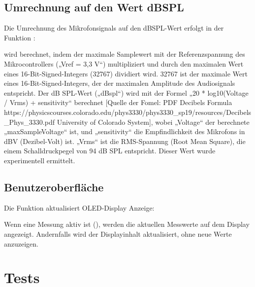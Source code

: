 \subsection{Umrechnung auf den Wert dBSPL}

Die Umrechnung des Mikrofonsignals auf den dBSPL-Wert erfolgt in der Funktion :

{
    \label{TestMicrophone:dBSPL}
}

 wird berechnet, indem der maximale Samplewert  mit der Referenzspannung des Mikrocontrollers („Vref = 3,3 V“) multipliziert und durch den maximalen Wert eines 16-Bit-Signed-Integers (32767) dividiert wird. 32767 ist der maximale Wert eines 16-Bit-Signed-Integers, der der maximalen Amplitude des Audiosignals entspricht.
Der dB SPL-Wert („dBspl“) wird mit der Formel „20 * log10(Voltage / Vrms) + sensitivity“ berechnet [Quelle der Fomel: PDF Decibels Formula https://physicscourses.colorado.edu/phys3330/phys3330\_sp19/resources/Decibels\_Phys\_3330.pdf University of Colorado System], wobei „Voltage“ der berechnete „maxSampleVoltage“ ist, und „sensitivity“ die Empfindlichkeit des Mikrofons in dBV (Dezibel-Volt) ist. „Vrms“ ist die RMS-Spannung (Root Mean Square), die einem Schalldruckpegel von 94 dB SPL entspricht. Dieser Wert wurde experimentell ermittelt.


\subsection{Benutzeroberfläche}
Die Funktion  aktualisiert OLED-Display Anzeige:


{
    \label{TestMicrophone:OLED}
}


Wenn eine Messung aktiv ist (), werden die aktuellen Messwerte auf dem Display angezeigt. Andernfalls wird der Displayinhalt aktualisiert, ohne neue Werte anzuzeigen.




\section{Tests}


